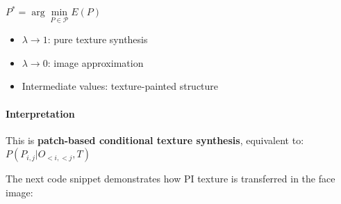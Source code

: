 \documentclass[11pt]{article}
\providecommand{\tightlist}{%
      \setlength{\itemsep}{0pt}\setlength{\parskip}{0pt}}
\begin{document}
\(P^* = \arg\underset{P \in \mathcal{P}}{\min} E(P)\)

\begin{itemize}
\tightlist
\item
  \(\lambda \rightarrow 1\): pure texture synthesis
\item
  \(\lambda \rightarrow 0\): image approximation
\item
  Intermediate values: texture-painted structure
\end{itemize}

\hypertarget{interpretation}{%
\paragraph{\texorpdfstring{\textbf{Interpretation}}{Interpretation}}\label{interpretation}}

This is \textbf{patch-based conditional texture synthesis}, equivalent
to: \(P(P_{i,j} | O_{<i,<j}, T)\)

The next code snippet demonstrates how PI texture is transferred in the
face image:
\end{document}
